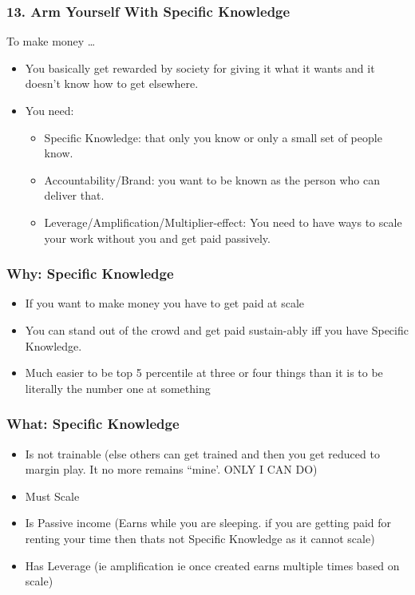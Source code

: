 \begin{frame}[fragile]
\frametitle{13. Arm Yourself With Specific Knowledge}
To make money \ldots
\begin{itemize}
\item You basically get rewarded by society for giving it what it wants and it doesn’t know how to get elsewhere.
\item You need:
\begin{itemize}
\item Specific Knowledge: that only you know or only a small set of people know.
\item Accountability/Brand: you want to be known as the person who can deliver that.
\item Leverage/Amplification/Multiplier-effect: You need to have ways to scale your work without you and get paid passively.
\end{itemize}
\end{itemize}
\end{frame}

\begin{frame}[fragile]
\frametitle{Why: Specific Knowledge}
\begin{itemize}
\item If you want to make money you have to get paid at scale
\item You can stand out of the crowd and get paid sustain-ably iff you have Specific Knowledge.
\item  Much easier to be top 5 percentile at three or four things than it is to be literally the number one at something
\end{itemize}
\end{frame}

\begin{frame}[fragile]
\frametitle{What: Specific Knowledge}
\begin{itemize}
\item Is not trainable (else others can get trained and then you get reduced to margin play. It no more remains ``mine'. ONLY I CAN DO)
\item Must Scale
\item Is Passive income (Earns while you are sleeping. if you are getting paid for renting your time then thats not Specific Knowledge as it cannot scale)
\item Has Leverage (ie amplification ie once created earns multiple times based on scale)
\end{itemize}
\end{frame}

